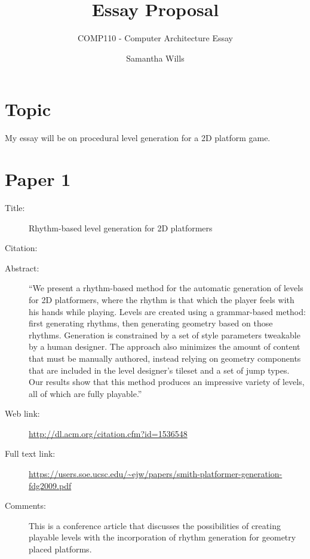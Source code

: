 \documentclass{scrartcl}
\title{Essay Proposal}
\subtitle{COMP110 - Computer Architecture Essay}
\author{Samantha Wills}
\begin{document}
\maketitle

\section*{Topic}

My essay will be on
   procedural level generation for a 2D platform game.

\section*{Paper 1}
\begin{description}
\item[Title:] Rhythm-based level generation for 2D platformers
\item[Citation:] \cite{Smith:2009}
\item[Abstract:] ``We present a rhythm-based method for the automatic generation of levels for 2D platformers, where the rhythm is that which the player feels with his hands while playing. Levels are created using a grammar-based method: first generating rhythms, then generating geometry based on those rhythms. Generation is constrained by a set of style parameters tweakable by a human designer. The approach also minimizes the amount of content that must be manually authored, instead relying on geometry components that are included in the level designer's tileset and a set of jump types. Our results show that this method produces an impressive variety of levels, all of which are fully playable.''
\item[Web link:] \url{http://dl.acm.org/citation.cfm?id=1536548}
\item[Full text link:] \url{https://users.soe.ucsc.edu/~ejw/papers/smith-platformer-generation-fdg2009.pdf}
\item[Comments:] This is a conference article that discusses the possibilities of creating playable levels with the incorporation of rhythm generation for geometry placed platforms.
\end{description}
\end{document}
